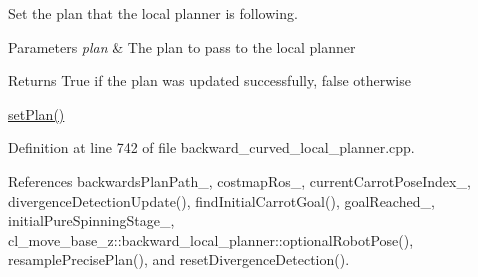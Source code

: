 Set the plan that the local planner is following. 


\begin{DoxyParams}{Parameters}
{\em plan} & The plan to pass to the local planner \\
\hline
\end{DoxyParams}
\begin{DoxyReturn}{Returns}
True if the plan was updated successfully, false otherwise
\end{DoxyReturn}
\hyperlink{classcl__move__base__z_1_1backward__local__planner_1_1BackwardLocalPlanner_ab11a0eec45f24b5a5a3987a50427eed4}{set\+Plan()} 

Definition at line 742 of file backward\+\_\+curved\+\_\+local\+\_\+planner.\+cpp.



References backwards\+Plan\+Path\+\_\+, costmap\+Ros\+\_\+, current\+Carrot\+Pose\+Index\+\_\+, divergence\+Detection\+Update(), find\+Initial\+Carrot\+Goal(), goal\+Reached\+\_\+, initial\+Pure\+Spinning\+Stage\+\_\+, cl\+\_\+move\+\_\+base\+\_\+z\+::backward\+\_\+local\+\_\+planner\+::optional\+Robot\+Pose(), resample\+Precise\+Plan(), and reset\+Divergence\+Detection().


